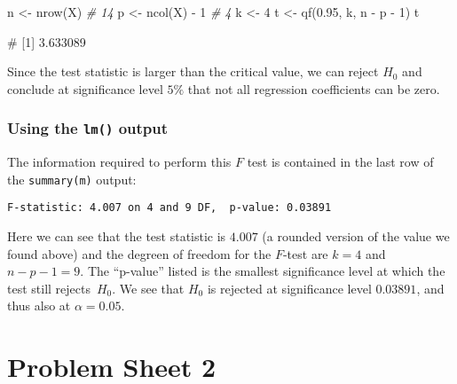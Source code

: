 \documentclass[
  a4paper,
]{article}
\newenvironment{Shaded}{\begin{snugshade}}{\end{snugshade}}
\newcommand{\CommentTok}[1]{\textcolor[rgb]{0.56,0.35,0.01}{\textit{#1}}}
\newcommand{\DecValTok}[1]{\textcolor[rgb]{0.00,0.00,0.81}{#1}}
\newcommand{\FloatTok}[1]{\textcolor[rgb]{0.00,0.00,0.81}{#1}}
\newcommand{\FunctionTok}[1]{\textcolor[rgb]{0.00,0.00,0.00}{#1}}
\newcommand{\NormalTok}[1]{#1}
\newcommand{\OtherTok}[1]{\textcolor[rgb]{0.56,0.35,0.01}{#1}}
\newcommand{\SpecialCharTok}[1]{\textcolor[rgb]{0.00,0.00,0.00}{#1}}
\theoremstyle{definition}
\theoremstyle{definition}
\theoremstyle{definition}
\theoremstyle{definition}
\theoremstyle{remark}
\begin{document}
\begin{Shaded}
\begin{Highlighting}[]
\NormalTok{n }\OtherTok{\textless{}{-}} \FunctionTok{nrow}\NormalTok{(X)      }\CommentTok{\# 14}
\NormalTok{p }\OtherTok{\textless{}{-}} \FunctionTok{ncol}\NormalTok{(X) }\SpecialCharTok{{-}} \DecValTok{1}  \CommentTok{\# 4}
\NormalTok{k }\OtherTok{\textless{}{-}} \DecValTok{4}
\NormalTok{t }\OtherTok{\textless{}{-}} \FunctionTok{qf}\NormalTok{(}\FloatTok{0.95}\NormalTok{, k, n }\SpecialCharTok{{-}}\NormalTok{ p }\SpecialCharTok{{-}} \DecValTok{1}\NormalTok{)}
\NormalTok{t}
\end{Highlighting}
\end{Shaded}

\begin{Shaded}
\begin{Highlighting}[]
\NormalTok{\# [1] 3.633089}
\end{Highlighting}
\end{Shaded}

Since the test statistic is larger than the critical value, we can
reject \(H_0\) and conclude at significance level \(5\%\) that not
all regression coefficients can be zero.

\hypertarget{using-the-lm-output}{%
\subsubsection{\texorpdfstring{Using the \texttt{lm()} output}{Using the lm() output}}\label{using-the-lm-output}}

The information required to perform this \(F\) test is contained
in the last row of the \texttt{summary(m)} output:

\begin{verbatim}
F-statistic: 4.007 on 4 and 9 DF,  p-value: 0.03891
\end{verbatim}

Here we can see that the test statistic is \(4.007\) (a rounded version
of the value we found above) and the degreen of freedom for the \(F\)-test
are \(k = 4\) and \(n - p - 1 = 9\). The ``p-value'' listed is the smallest
significance level at which the test still rejects~\(H_0\).
We see that \(H_0\) is rejected at significance level \(0.03891\),
and thus also at \(\alpha=0.05\).

\clearpage

\hypertarget{P02}{%
\section*{Problem Sheet 2}\label{P02}}
\end{document}
